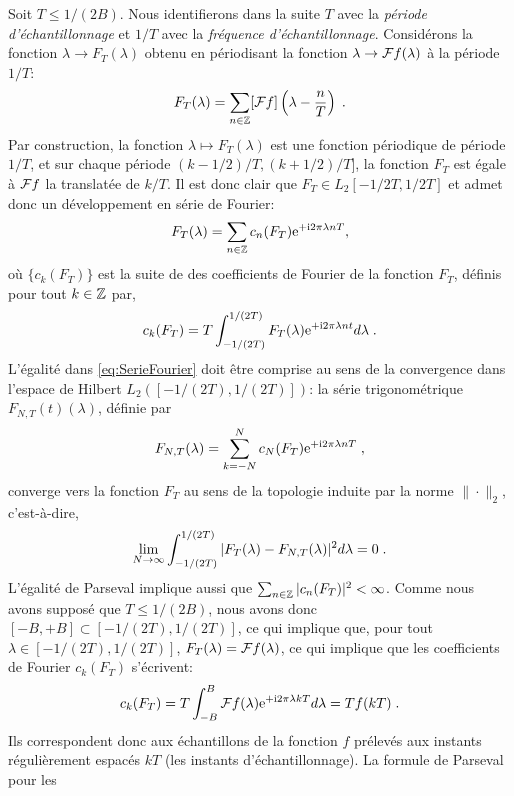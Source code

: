 Soit  $T \leq 1/(2B)$. Nous identifierons dans la suite $T$ avec la \emph{p{\'e}riode d'{\'e}chantillonnage} et $1/T$ avec la \emph{fr{\'e}quence d'{\'e}chantillonnage}.
Consid{\'e}rons la fonction $\lambda \to F_T(\lambda)$ obtenu en p{\'e}riodisant la fonction $\lambda \to \mathcal{F} f(\lambda)$ {\`a} la p{\'e}riode $1/T$:
$$
F_T (\lambda) = \sum_{n \in \mathbb{Z}} [\mathcal{F} f] \left( \lambda - \frac{n}{T} \right) \;.
$$
Par construction, la fonction $\lambda \mapsto F_T(\lambda)$ est une fonction p{\'e}riodique de p{\'e}riode $1/T$, et sur chaque
p{\'e}riode $(k-1/2)/T,(k+1/2)/T]$, la fonction $F_T$ est {\'e}gale {\`a}  $\mathcal{F} f$ la translat{\'e}e de $k/T$.  Il est donc clair que
$F_T \in L_2{[-1/2T,1/2T]}$ et  admet donc un d{\'e}veloppement en s{\'e}rie de
Fourier:
\begin{equation}
\label{eq:SerieFourier}
F_T (\lambda) = \sum_{n \in \mathbb{Z}} c_n(F_T) \mathrm{e}^{+ \mathrm{i} 2 \pi \lambda n T},
\end{equation}
o{\`u} $\{c_k(F_T)\}$ est la suite de des coefficients de Fourier de la fonction $F_T$,
d{\'e}finis pour tout $k\in\mathbb{Z}$ par,
\begin{equation}
\label{eq:CoefficientFourier}
c_k(F_T) = T \int_{-1/(2T)}^{1/(2T)} F_T(\lambda) \mathrm{e}^{+ \mathrm{i} 2 \pi \lambda n t} d \lambda\;.
\end{equation}
L'{\'e}galit{\'e} dans \eqref{eq:SerieFourier} doit {\^e}tre comprise au sens de la convergence dans l'espace de Hilbert
$L_2([-1/(2T),1/(2T)])$: la s{\'e}rie trigonom{\'e}trique $F_{N,T}(t)(\lambda)$, d{\'e}finie par
\begin{equation}
F_{N,T}(\lambda)= \sum_{k=-N}^N c_N(F_T) \mathrm{e}^{+ \mathrm{i} 2 \pi \lambda n T} \;,
\end{equation}
converge vers la fonction $F_T$ au sens de la topologie induite par la norme $\|\cdot\|_2$, c'est-{\`a}-dire,
$$
\lim_{N \to \infty} \int_{-1/(2T)}^{1/(2T)} |F_T(\lambda) - F_{N,T}(\lambda)|^2 d \lambda =0 \;.
$$
L'{\'e}galit{\'e} de Parseval implique aussi que $\sum_{n \in \mathbb{Z}} |c_n(F_T)|^2 < \infty$. Comme nous avons suppos{\'e} que $T \leq
1/(2B)$, nous avons donc $[-B,+B] \subset [-1/(2T), 1/(2T)]$,
ce qui implique que, pour tout $\lambda \in [-1/(2T),1/(2T)]$, $F_T(\lambda) = \mathcal{F} f(\lambda)$, ce qui implique que les
coefficients de Fourier $c_k(F_T)$ s'{\'e}crivent:
\begin{equation}
\label{eq:CoefficientFourier}
c_k(F_T) = T \int_{-B}^{B} \mathcal{F} f(\lambda) \mathrm{e}^{+ \mathrm{i} 2 \pi \lambda k T} d \lambda= T f(kT)\;.
\end{equation}
Ils correspondent donc aux {\'e}chantillons de la fonction $f$ pr{\'e}lev{\'e}s aux instants r{\'e}guli{\`e}rement espac{\'e}s $kT$ (les instants d'{\'e}chantillonnage). La formule de Parseval pour les
